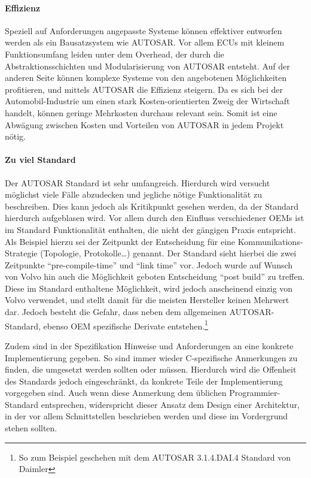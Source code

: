 \documentclass[
  a4paper,					    %
  twoside,
  DIV=calc,     				%
  bibliography=totoc,
  cleardoublepage=empty,
  ngerman,     					%
  final       					%
]{scrbook}
\begin{document}
\paragraph{Effizienz}
Speziell auf Anforderungen angepasste Systeme können effektiver entworfen werden als ein Bausatzsystem wie AUTOSAR. Vor allem ECUs mit kleinem Funktionsumfang leiden unter dem Overhead, der durch die Abstraktionsschichten und Modularisierung von AUTOSAR entsteht. Auf der anderen Seite können komplexe Systeme von den angebotenen Möglichkeiten profitieren, und mittels AUTOSAR die Effizienz steigern.\cite{as_kritik}\cite{wiki:autosar} Da es sich bei der Automobil-Industrie um einen stark Kosten-orientierten Zweig der Wirtschaft handelt, können geringe Mehrkosten durchaus relevant sein. Somit ist eine Abwägung zwischen Kosten und Vorteilen von AUTOSAR in jedem Projekt nötig.\cite[Seite 152]{SE_Autosar} 

\paragraph{Zu viel Standard}
Der AUTOSAR Standard ist sehr umfangreich. Hierdurch wird versucht möglichst viele Fälle abzudecken und jegliche nötige Funktionalität zu beschreiben. Dies kann jedoch als Kritikpunkt gesehen werden, da der Standard hierdurch aufgeblasen wird. Vor allem durch den Einfluss verschiedener OEMs ist im Standard Funktionalität enthalten, die nicht der gängigen Praxis entspricht. Als Beispiel hierzu sei der Zeitpunkt der Entscheidung für eine Kommunikations-Strategie (Topologie, Protokolle\dots) genannt.\cite{as_kritik} Der Standard sieht hierbei die zwei Zeitpunkte "`pre-compile-time"' und "`link time"' vor. Jedoch wurde auf Wunsch von Volvo hin auch die Möglichkeit geboten Entscheidung "`post build"' zu treffen. Diese im Standard enthaltene Möglichkeit, wird jedoch anscheinend einzig von Volvo verwendet, und stellt damit für die meisten Hersteller keinen Mehrwert dar. Jedoch besteht die Gefahr, dass neben dem allgemeinen AUTOSAR-Standard, ebenso OEM spezifische Derivate entstehen.\footnote{So zum Beispiel geschehen mit dem AUTOSAR 3.1.4.DAI.4 Standard von Daimler}

Zudem sind in der Spezifikation Hinweise und Anforderungen an eine konkrete Implementierung gegeben. So sind immer wieder C-spezifische Anmerkungen zu finden, die umgesetzt werden sollten oder müssen. Hierdurch wird die Offenheit des Standards jedoch eingeschränkt, da konkrete Teile der Implementierung vorgegeben sind.\cite[Seite 20]{autosar_eth} Auch wenn diese Anmerkung dem üblichen Programmier-Standard entsprechen, widerspricht dieser Ansatz dem Design einer Architektur, in der vor allem Schnittstellen beschrieben werden und diese im Vordergrund stehen sollten.\cite{objektorientierung}
\end{document}
